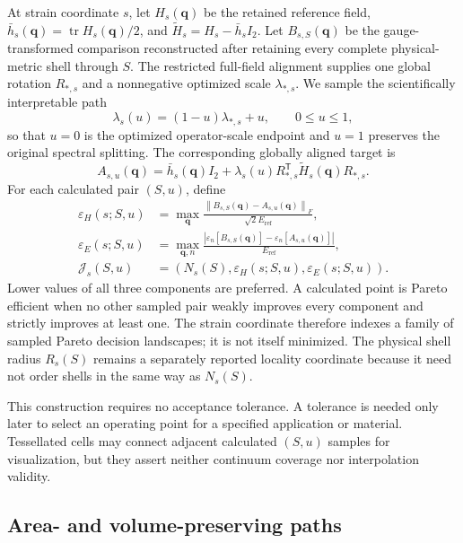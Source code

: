 \documentclass[11pt]{article}
\newcommand{\norm}[1]{\left\lVert #1\right\rVert}
\begin{document}
At strain coordinate $s$, let $H_s(\mathbf q)$ be the retained reference field,
$\bar h_s(\mathbf q)=\operatorname{tr}H_s(\mathbf q)/2$, and
$\widetilde H_s=H_s-\bar h_s I_2$. Let $B_{s,S}(\mathbf q)$ be the gauge-transformed
comparison reconstructed after retaining every complete physical-metric shell through
$S$. The restricted full-field alignment supplies one global rotation $R_{*,s}$ and a
nonnegative optimized scale $\lambda_{*,s}$. We sample the scientifically interpretable
path
\begin{equation}
 \lambda_s(u)=(1-u)\lambda_{*,s}+u,
 \qquad 0\le u\le1,
 \label{eq:scale-path}
\end{equation}
so that $u=0$ is the optimized operator-scale endpoint and $u=1$ preserves the original
spectral splitting. The corresponding globally aligned target is
\begin{equation}
 A_{s,u}(\mathbf q)=\bar h_s(\mathbf q)I_2+
 \lambda_s(u)R_{*,s}^{\mathsf T}\widetilde H_s(\mathbf q)R_{*,s}.
 \label{eq:scale-path-target}
\end{equation}
For each calculated pair $(S,u)$, define
\begin{align}
 \varepsilon_H(s;S,u)
 &=\max_{\mathbf q}\frac{\norm{B_{s,S}(\mathbf q)-A_{s,u}(\mathbf q)}_F}
 {\sqrt2E_{\mathrm{ref}}},\\
 \varepsilon_E(s;S,u)
 &=\max_{\mathbf q,n}\frac{
 \left|\varepsilon_n[B_{s,S}(\mathbf q)]-
 \varepsilon_n[A_{s,u}(\mathbf q)]\right|}{E_{\mathrm{ref}}},\\
 \mathcal J_s(S,u)
 &=\left(N_s(S),\varepsilon_H(s;S,u),\varepsilon_E(s;S,u)\right).
 \label{eq:pareto-decision-objectives}
\end{align}
Lower values of all three components are preferred. A calculated point is Pareto
efficient when no other sampled pair weakly improves every component and strictly
improves at least one. The strain coordinate therefore indexes a family of sampled
Pareto decision landscapes; it is not itself minimized. The physical shell radius
$R_s(S)$ remains a separately reported locality coordinate because it need not order
shells in the same way as $N_s(S)$.

This construction requires no acceptance tolerance. A tolerance is needed only later to
select an operating point for a specified application or material. Tessellated cells may
connect adjacent calculated $(S,u)$ samples for visualization, but they assert neither
continuum coverage nor interpolation validity.

\subsection{Area- and volume-preserving paths}
\end{document}

